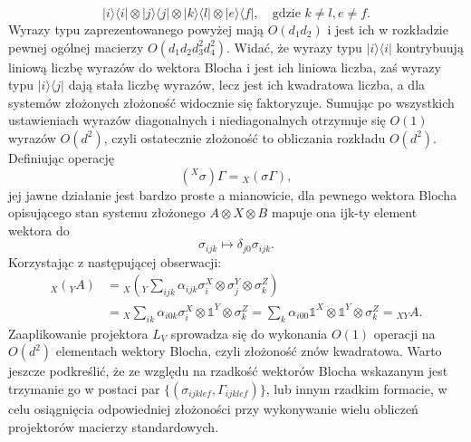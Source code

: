 \documentclass[10pt]{article} %
\newcommand{\Ket}[1]{|#1\rangle}
\newcommand{\Bra}[1]{\langle#1|}
\newcommand{\I}{\mathbb{1}}
\begin{document}
\begin{appendices}
\begin{equation}
\Ket{i}\Bra{i} \otimes \Ket{j}\Bra{j} \otimes \Ket{k}\Bra{l} \otimes \Ket{e}\Bra{f}, \quad \text{gdzie }k \neq l, e \neq f.
\end{equation} Wyrazy typu zaprezentowanego powyżej mają $O(d_1d_2)$ i jest ich w rozkładzie pewnej ogólnej macierzy $O(d_1d_2d_3^2d_4^2)$. Widać, że wyrazy typu $\Ket{i}\Bra{i}$ kontrybuują liniową liczbę wyrazów do wektora Blocha i jest ich liniowa liczba, zaś wyrazy typu $\Ket{i}\Bra{j}$ dają stała liczbę wyrazów, lecz jest ich kwadratowa liczba, a dla systemów złożonych złożoność widocznie się faktoryzuje. Sumując po wszystkich ustawieniach wyrazów diagonalnych i niediagonalnych otrzymuje się $O(1)$ wyrazów $O(d^2)$, czyli ostatecznie złożoność to obliczania rozkładu $O(d^2)$.
Definiując operację
\begin{equation}
({}^X\sigma) \Gamma = {}_X(\sigma\Gamma),
\end{equation} jej jawne działanie jest bardzo proste a mianowicie, dla pewnego wektora Blocha opisującego stan systemu złożonego $A \otimes X \otimes B$ mapuje ona ijk-ty element wektora do
\begin{equation}
\sigma_{ijk} \mapsto \delta_{j0}\sigma_{ijk}.
\end{equation}
Korzystając z następującej obserwacji:
\begin{equation}
\begin{split}
{}_{X}({}_{Y}A) &= {}_{X}({}_{Y} \sum_{ijk} \alpha_{ijk} \sigma_i^X \otimes \sigma_j^Y\otimes \sigma_k^Z)\\ &= {}_X \sum_{ik} \alpha_{i0k} \sigma_i^X \otimes \I^Y \otimes \sigma_k^Z = \sum_k \alpha_{i00} \I^X\otimes \I^Y \otimes \sigma_k^Z = {}_{XY} A.
\end{split}
\end{equation} Zaaplikowanie projektora $L_V$ sprowadza się do wykonania $O(1)$ operacji na $O(d^2)$ elementach wektory Blocha, czyli złożoność znów kwadratowa.
Warto jeszcze podkreślić, że ze względu na rzadkość wektorów Blocha wskazanym jest trzymanie go w postaci par $\{ (\sigma_{ijklef}, \Gamma_{ijklef}) \}$, lub innym rzadkim formacie, w celu osiągnięcia odpowiedniej złożoności przy wykonywanie wielu obliczeń projektorów macierzy standardowych.

\end{appendices}
\end{document}
